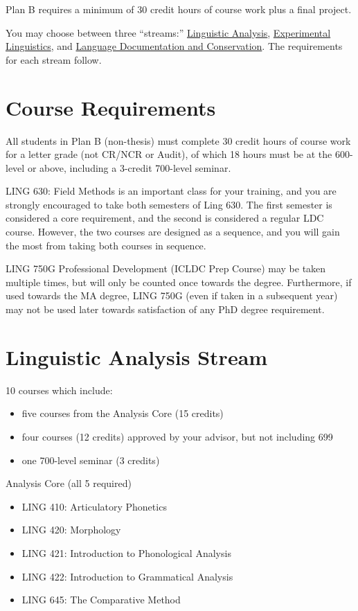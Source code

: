 \documentclass[
]{book}
\providecommand{\tightlist}{%
  \setlength{\itemsep}{0pt}\setlength{\parskip}{0pt}}
\begin{document}
Plan B requires a minimum of 30 credit hours of course work plus a final project.

You may choose between three ``streams:''
\hyperref[analysis-stream]{Linguistic Analysis},
\hyperref[experimental-stream]{Experimental Linguistics}, and
\hyperref[ldc-stream]{Language Documentation and Conservation}.
The requirements for each stream follow.

\section{Course Requirements}\label{course-requirements-1}

All students in Plan B (non-thesis) must complete 30 credit hours of course work for a letter grade (not CR/NCR or Audit), of which 18 hours must be at the 600-level or above, including a 3-credit 700-level seminar.

LING 630: Field Methods is an important class for your training, and you are strongly encouraged to take both semesters of Ling 630. The first semester is considered a core requirement, and the second is considered a regular LDC course. However, the two courses are designed as a sequence, and you will gain the most from taking both courses in sequence.

LING 750G Professional Development (ICLDC Prep Course) may be taken multiple times, but will only be counted once towards the degree. Furthermore, if used towards the MA degree, LING 750G (even if taken in a subsequent year) may not be used later towards satisfaction of any PhD degree requirement.

\section{Linguistic Analysis Stream}\label{analysis-stream}

10 courses which include:

\begin{itemize}
\tightlist
\item
  five courses from the Analysis Core (15 credits)
\item
  four courses (12 credits) approved by your advisor, but not including 699
\item
  one 700-level seminar (3 credits)
\end{itemize}

Analysis Core (all 5 required)

\begin{itemize}
\tightlist
\item
  LING 410: Articulatory Phonetics
\item
  LING 420: Morphology
\item
  LING 421: Introduction to Phonological Analysis
\item
  LING 422: Introduction to Grammatical Analysis
\item
  LING 645: The Comparative Method
\end{itemize}
\end{document}
